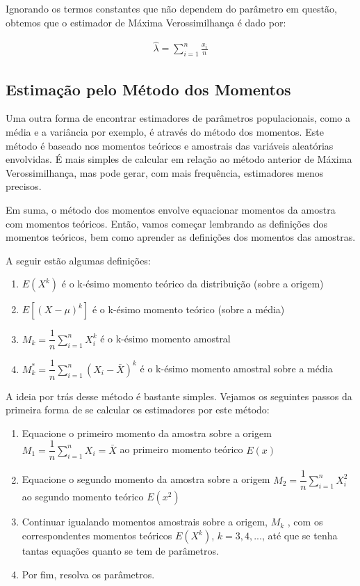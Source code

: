 Ignorando os termos constantes que não dependem do parâmetro em questão, obtemos que o estimador de Máxima Verossimilhança é dado por:

\begin{align}
\hat{\lambda}=\sum\limits^n_{i=1}\frac{x_i}{n}
\end{align}

\subsection{Estimação pelo Método dos Momentos}

Uma outra forma de encontrar estimadores de parâmetros populacionais, como a média e a variância por exemplo, é através do método dos momentos. Este método é baseado nos momentos teóricos e amostrais das variáveis aleatórias envolvidas. É mais simples de calcular em relação ao método anterior de Máxima Verossimilhança, mas pode gerar, com mais frequência, estimadores menos precisos. 

Em suma, o método dos momentos envolve equacionar momentos da amostra com momentos teóricos. Então, vamos começar lembrando as definições dos momentos teóricos, bem como aprender as definições dos momentos das amostras.

A seguir estão algumas definições:

\begin{enumerate}
	\item $E(X^k)$ é o k-ésimo momento teórico da distribuição (sobre a origem)
    \item $E\left[(X-\mu)^k\right]$ é o k-ésimo momento teórico (sobre a média)
    \item $M_k=\dfrac{1}{n}\sum\limits_{i=1}^n X_i^k$ é o k-ésimo momento amostral 
    \item $M_k^\ast =\dfrac{1}{n}\sum\limits_{i=1}^n (X_i-\bar{X})^k$ é o k-ésimo momento amostral sobre a média
    
\end{enumerate}

A ideia por trás desse método é bastante simples. Vejamos os seguintes passos da primeira forma de se calcular os estimadores por este método:

\begin{enumerate}
  \item Equacione o primeiro momento da amostra sobre a origem $M_1=\dfrac{1}{n}\sum\limits_{i=1}^n X_i=\bar{X}$ ao primeiro momento teórico $E(x)$
  \item Equacione o segundo momento da amostra sobre a origem $M_2=\dfrac{1}{n}\sum\limits_{i=1}^n X_i^2$ ao segundo momento teórico $E(x^2)$ 
  \item Continuar igualando momentos amostrais sobre a origem, $M_k$ , com os correspondentes momentos teóricos  $E(X^k)$, $k = 3, 4, ...$, até que se tenha tantas equações quanto se tem de parâmetros.
  \item Por fim, resolva os parâmetros.
  
\end{enumerate}

